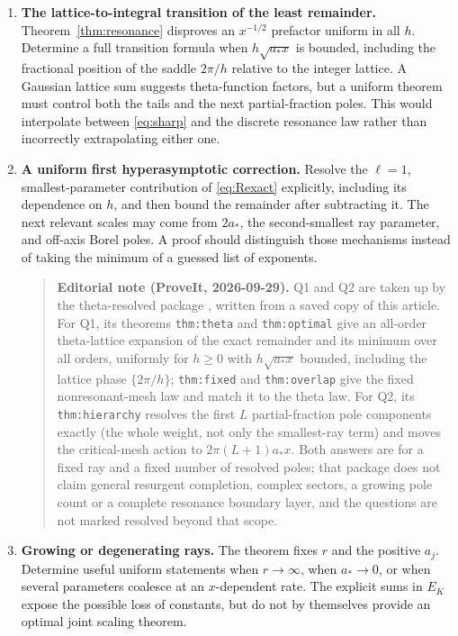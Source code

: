 \documentclass[11pt,a4paper]{article}
\numberwithin{equation}{section}
\theoremstyle{definition}\newtheorem{definition}[theorem]{Definition}
\theoremstyle{remark}\newtheorem{remark}[theorem]{Remark}
\newcommand{\amin}{a_*}
\begin{document}
\begin{enumerate}[leftmargin=*,label=\textbf{Q\arabic*.},itemsep=6pt]
\item \textbf{The lattice-to-integral transition of the least remainder.}
Theorem~\ref{thm:resonance} disproves an $x^{-1/2}$ prefactor uniform in all
$h$. Determine a full transition formula when $h\sqrt{\amin x}$ is bounded,
including the fractional position of the saddle $2\pi/h$ relative to the
integer lattice. A Gaussian lattice sum suggests theta-function factors,
but a uniform theorem must control both the tails and the next partial-fraction
poles. This would interpolate between \eqref{eq:sharp} and the discrete
resonance law rather than incorrectly extrapolating either one.

\item \textbf{A uniform first hyperasymptotic correction.}
Resolve the $\ell=1$, smallest-parameter contribution of
\eqref{eq:Rexact} explicitly, including its dependence on $h$, and then bound
the remainder after subtracting it. The next relevant scales may come from
$2\amin$, the second-smallest ray parameter, and off-axis Borel poles.
A proof should distinguish those mechanisms instead of taking the minimum
of a guessed list of exponents.

\begin{quote}\small
\textbf{Editorial note (ProveIt, 2026-09-29).} Q1 and Q2 are taken up by the
theta-resolved package \cite{ed:siblings}, written from a saved copy of
this article. For Q1, its theorems \texttt{thm:theta} and
\texttt{thm:optimal} give an all-order theta-lattice expansion of the exact
remainder and its minimum over all orders, uniformly for $h\ge0$ with
$h\sqrt{a_*x}$ bounded, including the lattice phase $\{2\pi/h\}$;
\texttt{thm:fixed} and \texttt{thm:overlap} give the fixed nonresonant-mesh
law and match it to the theta law. For Q2, its \texttt{thm:hierarchy}
resolves the first $L$ partial-fraction pole components exactly (the whole
weight, not only the smallest-ray term) and moves the critical-mesh action
to $2\pi(L+1)a_*x$. Both answers are for a fixed ray and a fixed number of
resolved poles; that package does not claim general resurgent completion,
complex sectors, a growing pole count or a complete resonance boundary
layer, and the questions are not marked resolved beyond that scope.
\end{quote}

\item \textbf{Growing or degenerating rays.}
The theorem fixes $r$ and the positive $a_j$. Determine useful uniform
statements when $r\to\infty$, when $a_*\to0$, or when several parameters
coalesce at an $x$-dependent rate. The explicit sums in $E_K$ expose the
possible loss of constants, but do not by themselves provide an optimal
joint scaling theorem.


\end{enumerate}
\end{document}
